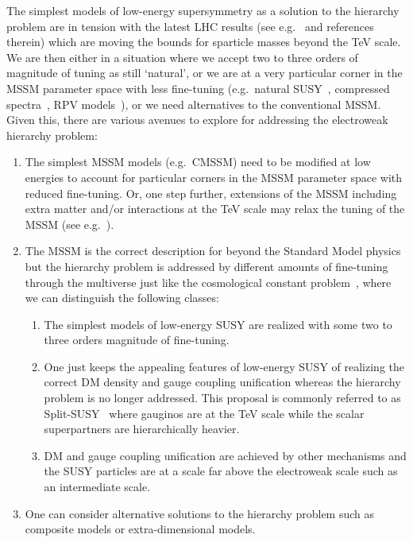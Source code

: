 \documentclass[12pt,a4paper]{book}
\begin{document}
The simplest models of low-energy supersymmetry as a solution to the hierarchy problem are in tension with the latest LHC results (see e.g.~\cite{Craig:2013cxa} and references therein) which are moving the bounds for sparticle masses beyond the TeV scale. We are then either in a situation where we accept two to three orders of magnitude of tuning as still `natural', or we are at a very particular corner in the MSSM parameter space with less fine-tuning (e.g.~natural SUSY~\cite{Kitano:2005ew,Papucci:2011wy,Brust:2011tb}, compressed spectra~\cite{Lebedev:2005ge,LeCompte:2011cn}, RPV models~\cite{Allanach:2012vj,Evans:2012bf}), or we need alternatives to the conventional MSSM. Given this, there are various avenues to explore for addressing the electroweak hierarchy problem:
\begin{enumerate}
\item The simplest MSSM models (e.g.~CMSSM) need to be modified at low energies to account for particular corners in the MSSM parameter space with reduced fine-tuning. Or, one step further, extensions of the MSSM including extra matter and/or interactions at the TeV scale may relax the tuning of the MSSM (see e.g.~\cite{Ross:2012nr}).
\item The MSSM is the correct description for beyond the Standard Model physics but the hierarchy problem is addressed by different amounts of fine-tuning through the multiverse just like the cosmological constant problem~\cite{Bousso:2000xa}, where we can distinguish the following classes:
\begin{enumerate}
\item The simplest models of low-energy SUSY are realized with some two to three orders magnitude of fine-tuning.
\item One just keeps the appealing features of low-energy SUSY of realizing the correct DM density and gauge coupling unification whereas the hierarchy problem is no longer addressed. This proposal is commonly referred to as Split-SUSY~\cite{ArkaniHamed:2004fb} where gauginos are at the TeV scale while the scalar superpartners are hierarchically heavier.
\item DM and gauge coupling unification are achieved by other mechanisms and the SUSY particles are at a scale far above the electroweak scale such as an intermediate scale.
\end{enumerate}
\item One can consider alternative solutions to the hierarchy problem such as composite models or extra-dimensional models.
\end{enumerate}
\end{document}
